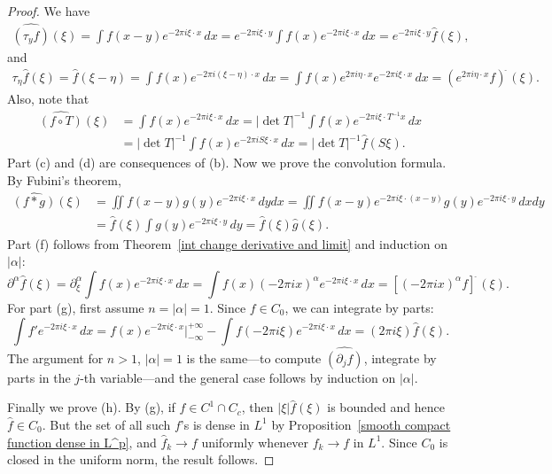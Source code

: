 \begin{proof}
We have
\begin{align*}
\widehat{(\tau_yf)}(\xi)=\int f(x-y)e^{-2\pi i\xi\cdot x}\,dx=e^{-2\pi i\xi\cdot y}\int f(x)e^{-2\pi i\xi\cdot x}\,dx=e^{-2\pi i\xi\cdot y}\hat{f}(\xi),
\end{align*}
and
\begin{align*}
\tau_{\eta}\hat{f}(\xi)=\hat{f}(\xi-\eta)=\int f(x)e^{-2\pi i(\xi-\eta)\cdot x}\,dx=\int f(x)e^{2\pi i\eta\cdot x}e^{-2\pi i\xi\cdot x}\,dx=(e^{2\pi i\eta\cdot x}f)^{\widehat{\ }}(\xi).
\end{align*}
Also, note that
\begin{align*}
\widehat{(f\circ T)}(\xi)&=\int f(x)e^{-2\pi i\xi\cdot x}\,dx=|\det T|^{-1}\int f(x)e^{-2\pi i\xi\cdot T^{-1}x}\,dx\\
&=|\det T|^{-1}\int f(x)e^{-2\pi iS\xi\cdot x}\,dx=|\det T|^{-1}\hat{f}(S\xi).
\end{align*}
Part (c) and (d) are consequences of (b). Now we prove the convolution formula. By Fubini's theorem,
\begin{align*}
\widehat{(f\ast g)}(\xi)&=\iint f(x-y)g(y)e^{-2\pi i\xi\cdot x}\,dydx=\iint f(x-y)e^{-2\pi i\xi\cdot(x-y)}g(y)e^{-2\pi i\xi\cdot y}\,dxdy\\
&=\hat{f}(\xi)\int g(y)e^{-2\pi i\xi\cdot y}\,dy=\hat{f}(\xi)\hat{g}(\xi).
\end{align*}
Part (f) follows from Theorem~\ref{int change derivative and limit} and induction on $|\alpha|$:
\[\partial^\alpha\hat{f}(\xi)=\partial^\alpha_\xi\int f(x)e^{-2\pi i\xi\cdot x}\,dx=\int f(x)(-2\pi ix)^\alpha e^{-2\pi i\xi\cdot x}\,dx=[(-2\pi ix)^\alpha f]^{\widehat{\ }}(\xi).\]
For part (g), first assume $n=|\alpha|=1$. Since $f\in C_0$, we can integrate by parts:
\[\int f'e^{-2\pi i\xi\cdot x}\,dx=f(x)e^{-2\pi i\xi\cdot x}\Big|_{-\infty}^{+\infty}-\int f(-2\pi i\xi)e^{-2\pi i\xi\cdot x}\,dx=(2\pi i\xi)\hat{f}(\xi).\]
The argument for $n>1$, $|\alpha|=1$ is the same---to compute $\widehat{(\partial_jf)}$, integrate by parts in the $j$-th variable---and the general case follows by induction on $|\alpha|$.\par
Finally we prove (h). By (g), if $f\in C^1\cap C_c$, then $|\xi|\hat{f}(\xi)$ is bounded and hence $\hat{f}\in C_0$. But the set of all such $f$'s is dense in $L^1$ by Proposition~\ref{smooth compact function dense in L^p}, and $\hat{f}_k\to f$ uniformly whenever $f_k\to f$ in $L^1$. Since $C_0$ is closed in the uniform norm, the result follows.
\end{proof}
